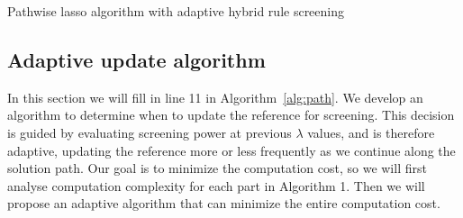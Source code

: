 \begin{algorithm}[H]
  \label{alg:path}
    \SetAlgoLined
    \BlankLine
    
    \caption{Pathwise lasso algorithm with adaptive hybrid rule screening}
\end{algorithm}

\subsection{Adaptive update algorithm}
\label{sec:adaptive}

In this section we will fill in line 11 in Algorithm~\ref{alg:path}. We develop an algorithm to determine when to update the reference for screening. This decision is guided by evaluating screening power at previous $\lambda$ values, and is therefore adaptive, updating the reference more or less frequently as we continue along the solution path. Our goal is to minimize the computation cost, so we will first analyse computation complexity for each part in Algorithm 1. Then we will propose an adaptive algorithm that can minimize the entire computation cost.

